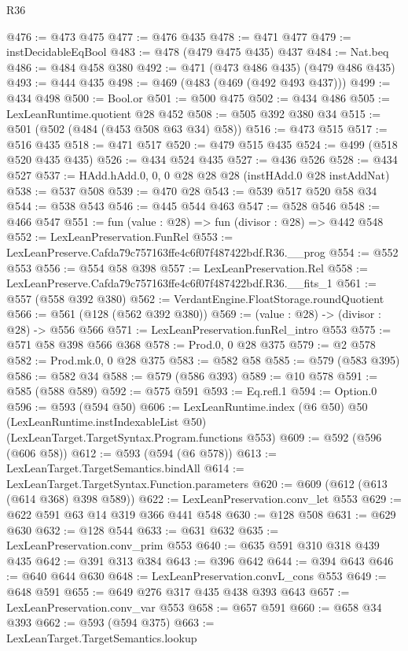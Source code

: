 \begin{lexlean}{R36}
\begin{coremodule}
@476 := @473 @475
@477 := @476 @435
@478 := @471 @477
@479 := instDecidableEqBool
@483 := @478 (@479 @475 @435) @437
@484 := Nat.beq
@486 := @484 @458 @380
@492 := @471 (@473 @486 @435) (@479 @486 @435)
@493 := @444 @435
@498 := @469 (@483 (@469 (@492 @493 @437)))
@499 := @434 @498
@500 := Bool.or
@501 := @500 @475
@502 := @434 @486
@505 := LexLeanRuntime.quotient @28 @452
@508 := @505 @392 @380 @34
@515 := @501 (@502 (@484 (@453 @508 @63 @34) @58))
@516 := @473 @515
@517 := @516 @435
@518 := @471 @517
@520 := @479 @515 @435
@524 := @499 (@518 @520 @435 @435)
@526 := @434 @524 @435
@527 := @436 @526
@528 := @434 @527
@537 := HAdd.hAdd.{0, 0, 0} @28 @28 @28 (instHAdd.{0} @28 instAddNat)
@538 := @537 @508
@539 := @470 @28
@543 := @539 @517 @520 @58 @34
@544 := @538 @543
@546 := @445 @544 @463
@547 := @528 @546
@548 := @466 @547
@551 := fun (value : @28) => fun (divisor : @28) => @442 @548
@552 := LexLeanPreservation.FunRel
@553 := LexLeanPreserve.Cafda79c757163ffe4c6f07f487422bdf.R36.__prog
@554 := @552 @553
@556 := @554 @58 @398
@557 := LexLeanPreservation.Rel
@558 := LexLeanPreserve.Cafda79c757163ffe4c6f07f487422bdf.R36.__fits_1
@561 := @557 (@558 @392 @380)
@562 := VerdantEngine.FloatStorage.roundQuotient
@566 := @561 (@128 (@562 @392 @380))
@569 := (value : @28) -> (divisor : @28) -> @556 @566
@571 := LexLeanPreservation.funRel_intro @553
@575 := @571 @58 @398 @566 @368
@578 := Prod.{0, 0} @28 @375
@579 := @2 @578
@582 := Prod.mk.{0, 0} @28 @375
@583 := @582 @58
@585 := @579 (@583 @395)
@586 := @582 @34
@588 := @579 (@586 @393)
@589 := @10 @578
@591 := @585 (@588 @589)
@592 := @575 @591
@593 := Eq.refl.{1}
@594 := Option.{0}
@596 := @593 (@594 @50)
@606 := LexLeanRuntime.index
    (@6 @50)
    @50
    (LexLeanRuntime.instIndexableList @50)
    (LexLeanTarget.TargetSyntax.Program.functions @553)
@609 := @592 (@596 (@606 @58))
@612 := @593 (@594 (@6 @578))
@613 := LexLeanTarget.TargetSemantics.bindAll
@614 := LexLeanTarget.TargetSyntax.Function.parameters
@620 := @609 (@612 (@613 (@614 @368) @398 @589))
@622 := LexLeanPreservation.conv_let @553
@629 := @622 @591 @63 @14 @319 @366 @441 @548
@630 := @128 @508
@631 := @629 @630
@632 := @128 @544
@633 := @631 @632
@635 := LexLeanPreservation.conv_prim @553
@640 := @635 @591 @310 @318 @439 @435
@642 := @391 @313 @384
@643 := @396 @642
@644 := @394 @643
@646 := @640 @644 @630
@648 := LexLeanPreservation.convL_cons @553
@649 := @648 @591
@655 := @649 @276 @317 @435 @438 @393 @643
@657 := LexLeanPreservation.conv_var @553
@658 := @657 @591
@660 := @658 @34 @393
@662 := @593 (@594 @375)
@663 := LexLeanTarget.TargetSemantics.lookup

\end{coremodule}
\end{lexlean}
